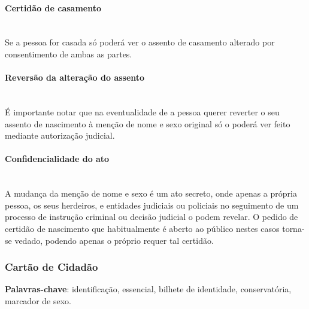 \paragraph{Certidão de casamento}
\leavevmode\\
Se a pessoa for casada só poderá ver o assento de casamento alterado por
consentimento de ambas as partes.

\paragraph{Reversão da alteração do assento}
\leavevmode\\
É importante notar que na eventualidade de a pessoa querer reverter o
seu assento de nascimento à menção de nome e sexo original só o poderá
ver feito mediante autorização judicial.

\paragraph{Confidencialidade do ato}
\leavevmode\\
A mudança da menção de nome e sexo é um ato secreto, onde apenas a
própria pessoa, os seus herdeiros, e entidades judiciais ou policiais no
seguimento de um processo de instrução criminal ou decisão judicial o
podem revelar. O pedido de certidão de nascimento que habitualmente é
aberto ao público nestes casos torna-se vedado, podendo apenas o próprio
requer tal certidão.

\subsubsection{Cartão de Cidadão}

\textbf{Palavras-chave}: identificação, essencial, bilhete de identidade, conservatória, marcador de sexo. \\

